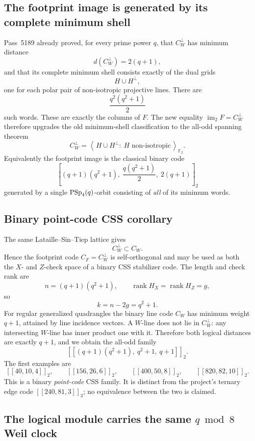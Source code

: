 \subsection{The footprint image is generated by its complete minimum shell}
\label{sec:pass5378-minimum-shell-spans}

Pass~5189 already proved, for every prime power $q$, that
$C_W^\perp$ has minimum distance
\[
 d(C_W^\perp)=2(q+1),
\]
and that its complete minimum shell consists exactly of the dual grids
\[
 H\cup H^\perp,
\]
one for each polar pair of non-isotropic projective lines.  There are
\[
 \frac{q^2(q^2+1)}2
\]
such words.  These are exactly the columns of $F$.  The new equality
$\operatorname{im}_2F=C_W^\perp$ therefore upgrades the old minimum-shell
classification to the all-odd spanning theorem
\[
 \boxed{
 C_W^\perp
 =\left\langle\,H\cup H^\perp:\ H\text{ non-isotropic}\,\right\rangle_{\mathbb F_2}.
 }
\]
Equivalently the footprint image is the classical binary code
\[
 \boxed{
 \left[(q+1)(q^2+1),\ \frac{q(q^2+1)}2,\ 2(q+1)\right]_2
 }
\]
generated by a single $\mathrm{PSp}_4(q)$-orbit consisting of \emph{all} of its
minimum words.

\subsection{Binary point-code CSS corollary}
\label{sec:pass5379-binary-css-family}

The same Lataille--Sin--Tiep lattice gives
\[
 C_W^\perp\subset C_W.
\]
Hence the footprint code $C_F=C_W^\perp$ is self-orthogonal and may be used as
both the $X$- and $Z$-check space of a binary CSS stabilizer code.  The length
and check rank are
\[
 n=(q+1)(q^2+1),
 \qquad
 \operatorname{rank}H_X=\operatorname{rank}H_Z=g,
\]
so
\[
 k=n-2g=q^2+1.
\]
For regular generalized quadrangles the binary line code $C_W$ has minimum
weight $q+1$, attained by line incidence vectors.  A $W$-line does not lie in
$C_W^\perp$: any intersecting $W$-line has inner product one with it.  Therefore
both logical distances are exactly $q+1$, and we obtain the all-odd family
\[
 \boxed{
 \left[\!\left[(q+1)(q^2+1),\ q^2+1,\ q+1\right]\!\right]_2.
 }
\]
The first examples are
\[
 [[40,10,4]]_2,\qquad
 [[156,26,6]]_2,\qquad
 [[400,50,8]]_2,\qquad
 [[820,82,10]]_2.
\]
This is a binary \emph{point-code} CSS family.  It is distinct from the
project's ternary edge code $[[240,81,3]]_3$; no equivalence between the two is
claimed.

\subsection{The logical module carries the same $q\bmod8$ Weil clock}
\label{sec:pass5406-css-logical-weil}

